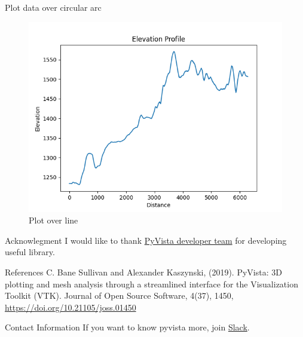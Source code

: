 \documentclass[final]{beamer}
\begin{document}
\begin{frame}[fragile]
\begin{textblock*}{800pt}
\begin{block}{Plot data over circular arc}
\end{block}

\begin{figure}
\includegraphics[width=0.5\linewidth]{elevation.png}
\caption{Plot over line \label{PlotOverCircularArcFigure}}
\end{figure}
\begin{block}{Acknowlegment}
I would like to thank \href{https://github.com/orgs/pyvista/teams/developers}{PyVista developer team} for developing useful library.
\end{block}
\begin{block}{References}
C. Bane Sullivan and Alexander Kaszynski, (2019). PyVista: 3D plotting and mesh analysis through a streamlined interface for the Visualization Toolkit (VTK). Journal of Open Source Software, 4(37), 1450, \url{https://doi.org/10.21105/joss.01450}
\end{block}
\begin{block}{Contact Information}
If you want to know pyvista more, join \href{http://slack.pyvista.org/}{Slack}.
\doclicenseThis
\end{block}
\end{textblock*}

\end{frame}
\end{document}
